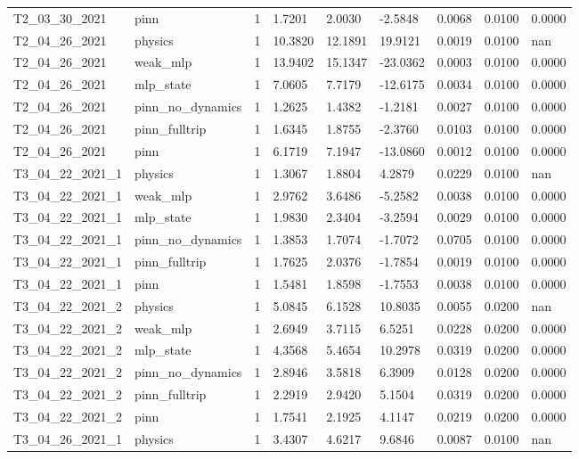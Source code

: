 \begin{table}[t]
\begin{tabular}{lllllllll}
T2\_03\_30\_2021 & pinn & 1 & 1.7201 & 2.0030 & -2.5848 & 0.0068 & 0.0100 & 0.0000 \\
T2\_04\_26\_2021 & physics & 1 & 10.3820 & 12.1891 & 19.9121 & 0.0019 & 0.0100 & nan \\
T2\_04\_26\_2021 & weak\_mlp & 1 & 13.9402 & 15.1347 & -23.0362 & 0.0003 & 0.0100 & 0.0000 \\
T2\_04\_26\_2021 & mlp\_state & 1 & 7.0605 & 7.7179 & -12.6175 & 0.0034 & 0.0100 & 0.0000 \\
T2\_04\_26\_2021 & pinn\_no\_dynamics & 1 & 1.2625 & 1.4382 & -1.2181 & 0.0027 & 0.0100 & 0.0000 \\
T2\_04\_26\_2021 & pinn\_fulltrip & 1 & 1.6345 & 1.8755 & -2.3760 & 0.0103 & 0.0100 & 0.0000 \\
T2\_04\_26\_2021 & pinn & 1 & 6.1719 & 7.1947 & -13.0860 & 0.0012 & 0.0100 & 0.0000 \\
T3\_04\_22\_2021\_1 & physics & 1 & 1.3067 & 1.8804 & 4.2879 & 0.0229 & 0.0100 & nan \\
T3\_04\_22\_2021\_1 & weak\_mlp & 1 & 2.9762 & 3.6486 & -5.2582 & 0.0038 & 0.0100 & 0.0000 \\
T3\_04\_22\_2021\_1 & mlp\_state & 1 & 1.9830 & 2.3404 & -3.2594 & 0.0029 & 0.0100 & 0.0000 \\
T3\_04\_22\_2021\_1 & pinn\_no\_dynamics & 1 & 1.3853 & 1.7074 & -1.7072 & 0.0705 & 0.0100 & 0.0000 \\
T3\_04\_22\_2021\_1 & pinn\_fulltrip & 1 & 1.7625 & 2.0376 & -1.7854 & 0.0019 & 0.0100 & 0.0000 \\
T3\_04\_22\_2021\_1 & pinn & 1 & 1.5481 & 1.8598 & -1.7553 & 0.0038 & 0.0100 & 0.0000 \\
T3\_04\_22\_2021\_2 & physics & 1 & 5.0845 & 6.1528 & 10.8035 & 0.0055 & 0.0200 & nan \\
T3\_04\_22\_2021\_2 & weak\_mlp & 1 & 2.6949 & 3.7115 & 6.5251 & 0.0228 & 0.0200 & 0.0000 \\
T3\_04\_22\_2021\_2 & mlp\_state & 1 & 4.3568 & 5.4654 & 10.2978 & 0.0319 & 0.0200 & 0.0000 \\
T3\_04\_22\_2021\_2 & pinn\_no\_dynamics & 1 & 2.8946 & 3.5818 & 6.3909 & 0.0128 & 0.0200 & 0.0000 \\
T3\_04\_22\_2021\_2 & pinn\_fulltrip & 1 & 2.2919 & 2.9420 & 5.1504 & 0.0319 & 0.0200 & 0.0000 \\
T3\_04\_22\_2021\_2 & pinn & 1 & 1.7541 & 2.1925 & 4.1147 & 0.0219 & 0.0200 & 0.0000 \\
T3\_04\_26\_2021\_1 & physics & 1 & 3.4307 & 4.6217 & 9.6846 & 0.0087 & 0.0100 & nan \\

\end{tabular}
\end{table}
